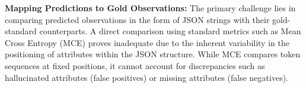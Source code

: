 \documentclass{article}
\begin{document}







\textbf{Mapping Predictions to Gold Observations:} The primary challenge lies in comparing predicted observations in the form of JSON strings with their gold-standard counterparts. A direct comparison using standard metrics such as Mean Cross Entropy (MCE) proves inadequate due to the inherent variability in the positioning of attributes within the JSON structure. While MCE compares token sequences at fixed positions, it cannot account for discrepancies such as hallucinated attributes (false positives) or missing attributes (false negatives).
\end{document}

